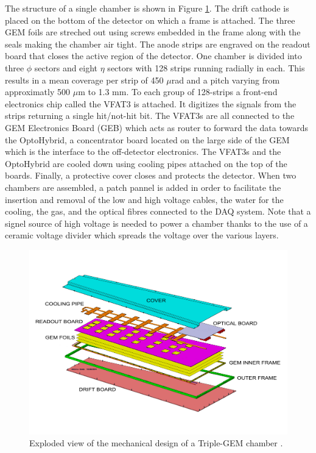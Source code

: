     The structure of a single chamber is shown in Figure \ref{fig:II-1-exploded}. The drift cathode is placed on the bottom of the detector on which a frame is attached. The three GEM foils are streched out using screws embedded in the frame along with the seals making the chamber air tight. The anode strips are engraved on the readout board that closes the active region of the detector. One chamber is divided into three $ \phi $ sectors and eight $ \eta $ sectors with 128 strips running radially in each. This results in a mean coverage per strip of 450 $\mu$rad and a pitch varying from approximatly 500 $\mu$m to 1.3 mm. To each group of 128-strips a front-end electronics chip called the VFAT3 is attached. It digitizes the signals from the strips returning a single hit/not-hit bit. The VFAT3s are all connected to the GEM Electronics Board (GEB) which acts as router to forward the data towards the OptoHybrid, a concentrator board located on the large side of the GEM which is the interface to the off-detector electronics. The VFAT3s and the OptoHybrid are cooled down using cooling pipes attached on the top of the boards. Finally, a protective cover closes and protects the detector. When two chambers are assembled, a patch pannel is added in order to facilitate the insertion and removal of the low and high voltage cables, the water for the cooling, the gas, and the optical fibres connected to the DAQ system. Note that a signel source of high voltage is needed to power a chamber thanks to the use of a ceramic voltage divider which spreads the voltage over the various layers. \\

    \begin{figure}[h!]
      \centering
      \includegraphics[width=\textwidth]{img/II-1-gem/gem-exploded.pdf}
      \caption{Exploded view of the mechanical design of a Triple-GEM chamber \cite{Colaleo:2021453}.}
      \label{fig:II-1-exploded}
    \end{figure}

